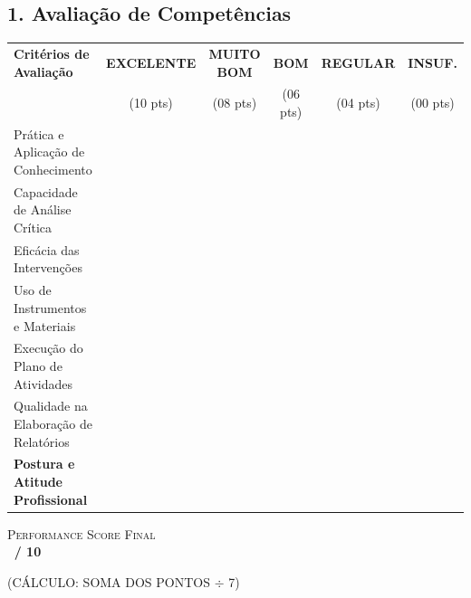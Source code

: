 \documentclass[a4paper,11pt]{article}
\newcommand{\checkbox}{\scalebox{1.5}{\color{Graphite!50}$\square$}}
\begin{document}
\begin{tcolorbox}[executivecard]
    \section{1. Avaliação de Competências}
    
    \renewcommand{\arraystretch}{1.5}
    \begin{tabularx}{\textwidth}{X c c c c c}
    \rowcolor{DeepNavy}
    \textbf{\color{white}\footnotesize Critérios de Avaliação} & \textbf{\tiny\color{white}EXCELENTE} & \textbf{\tiny\color{white}MUITO BOM} & \textbf{\tiny\color{white}BOM} & \textbf{\tiny\color{white}REGULAR} & \textbf{\tiny\color{white}INSUF.} \\
    \rowcolor{DeepNavy}
    & \tiny\color{DeepNavy!20}(10 pts) & \tiny\color{DeepNavy!20}(08 pts) & \tiny\color{DeepNavy!20}(06 pts) & \tiny\color{DeepNavy!20}(04 pts) & \tiny\color{DeepNavy!20}(00 pts) \\
    \midrule
    \footnotesize Prática e Aplicação de Conhecimento & \checkbox & \checkbox & \checkbox & \checkbox & \checkbox \\
    \footnotesize Capacidade de Análise Crítica & \checkbox & \checkbox & \checkbox & \checkbox & \checkbox \\
    \footnotesize Eficácia das Intervenções & \checkbox & \checkbox & \checkbox & \checkbox & \checkbox \\
    \footnotesize Uso de Instrumentos e Materiais & \checkbox & \checkbox & \checkbox & \checkbox & \checkbox \\
    \footnotesize Execução do Plano de Atividades & \checkbox & \checkbox & \checkbox & \checkbox & \checkbox \\
    \footnotesize Qualidade na Elaboração de Relatórios & \checkbox & \checkbox & \checkbox & \checkbox & \checkbox \\
    \rowcolor{SubtleGray}
    \footnotesize \textbf{Postura e Atitude Profissional} & \checkbox & \checkbox & \checkbox & \checkbox & \checkbox \\
    \bottomrule
    \end{tabularx}
\end{tcolorbox}

\vspace{0.3cm}

\begin{center}
    \begin{tcolorbox}[
        enhanced, width=9.5cm, arc=4pt, boxrule=1pt, 
        colback=white, colframe=DeepNavy,
        shadow={2pt}{-2pt}{0pt}{SubtleGray},
        halign=center
    ]
        {\scshape \small Performance Score Final} \\
        \vspace{0.2cm}
        {\Huge \textbf{\makebox[2cm]{\hrulefill} \, / 10}}
        \par \vspace{0.1cm} \tiny \color{Graphite} (CÁLCULO: SOMA DOS PONTOS $\div$ 7)
    \end{tcolorbox}
\end{center}
\end{document}
